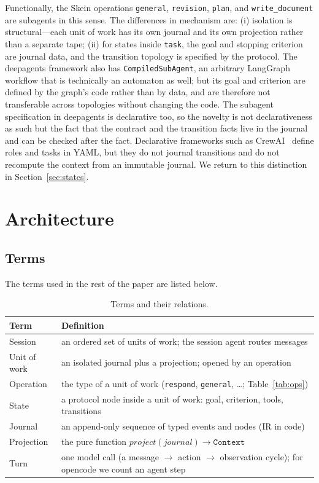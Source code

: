 \documentclass[11pt,a4paper]{article}
\begin{document}
Functionally, the Skein operations \texttt{general}, \texttt{revision}, \texttt{plan}, and
\texttt{write\_document} are subagents in this sense. The differences in mechanism are: (i)
isolation is structural---each unit of work has its own journal and its own projection rather
than a separate tape; (ii) for states inside \texttt{task}, the goal and stopping criterion are
journal data, and the transition topology is specified by the protocol. The deepagents framework also has
\texttt{CompiledSubAgent}, an arbitrary LangGraph workflow that is technically an automaton as
well; but its goal and criterion are defined by the graph's code rather than by data, and are
therefore not transferable across topologies without changing the code. The subagent
specification in deepagents is declarative too, so the novelty is not declarativeness as such
but the fact that the contract and the transition facts live in the journal and can be checked
after the fact. Declarative frameworks such as CrewAI~\cite{crewai} define roles and tasks in
YAML, but they do not journal transitions and do not recompute the context from an immutable
journal. We return to this distinction in Section~\ref{sec:states}.

\section{Architecture}
\label{sec:arch}

\subsection{Terms}

The terms used in the rest of the paper are listed below.

\begin{table}[h]
\centering
\small
\caption{Terms and their relations.}
\label{tab:terms}
\begin{tabularx}{\textwidth}{@{}lX@{}}
\toprule
Term & Definition \\
\midrule
Session & an ordered set of units of work; the session agent routes messages \\
Unit of work & an isolated journal plus a projection; opened by an operation \\
Operation & the type of a unit of work (\texttt{respond}, \texttt{general}, \ldots; Table~\ref{tab:ops}) \\
State & a protocol node inside a unit of work: goal, criterion, tools, transitions \\
Journal & an append-only sequence of typed events and nodes (IR in code) \\
Projection & the pure function $project(journal) \rightarrow \texttt{Context}$ \\
Turn & one model call (a message $\rightarrow$ action $\rightarrow$ observation cycle);
for opencode we count an agent step \\
\bottomrule
\end{tabularx}
\end{table}
\end{document}
